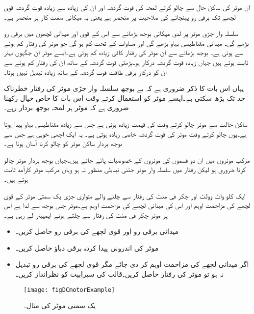 ان موٹر کی ساکن حال سے چالو کرتے لمحہ کی قوت گردشہ اور ان کی زیادہ سے زیادہ قوت گردشہ قوی لچھے تک برقی رو پہنچانے کی صلاحیت پر منحصر ہے یعنی یہ میکانی سمت کار پر منحصر ہے۔

سلسلہ وار جڑی موٹر پر لدی میکانی بوجھ بڑھانے سے اس کے قوی اور میدانی لچھوں میں برقی رو بڑھے گی۔ میدانی مقناطیسی بہاو بڑھے گی اور مساوات   کے تحت  کم ہو گی جو موٹر کی رفتار کم ہونے سے ہوتی ہے۔ بوجھ بڑھانے سے ان موٹر کی رفتار کافی زیادہ کم ہوتی ہے۔ایسے موٹر ان جگہوں بہتر ثابت ہوتے ہیں جہاں زیادہ قوت گردشہ درکار ہو۔بڑھتی قوت گردشہ کے ساتھ ان کی رفتار کم ہونے سے ان کو درکار برقی طاقت قوت گردشہ کے ساتھ زیادہ تبدیل نہیں ہوتا۔

یہاں اس بات کا ذکر ضروری ہے کہ بے بوجھ سلسلہ وار جڑی موٹر کی رفتار خطرناک حد تک بڑھ سکتی ہے۔ایسے موٹر کو استعمال کرتے وقت اس بات کا خاص خیال رکھنا ضروری ہے کہ موٹر ہر لمحہ بوجھ بردار رہے۔

ساکن حالت سے موٹر چالو کرتے وقت    کی قیمت زیادہ ہوتی ہے جس سے زیادہ  مقناطیسی بہاو پیدا ہوتا ہے۔یوں چالو کرتے وقت موٹر کی قوت گردشہ خاصی زیادہ ہوتی ہے۔ یہ ایک اچھی خوبی ہے جس سے بوجھ بردار ساکن موٹر کو چالو کرنا آسان ہوتا ہے۔

مرکب موٹروں میں ان دو قسموں کی موٹروں کے خصوصیات پائے جاتے ہیں۔جہاں بوجھ بردار موٹر چالو کرنا ضروری ہو لیکن رفتار میں سلسلہ وار موٹر جتنی تبدیلی منظور نہ ہو وہاں مرکب موٹر کارآمد ثابت ہوتے ہیں۔

ایک   کلو واٹ  وولٹ اور  چکر فی منٹ کی رفتار سے چلنے والے متوازی جڑی یک سمتی موٹر کے قوی لچھے کی مزاحمت  اوہم اور اس کی میدانی لچھے کی مزاحمت   اوہم ہے۔موٹر جس بوجھ سے لدا ہے اس پر موٹر   چکر فی منٹ کی رفتار سے چلتے ہوئے   ایمپیئر لے رہی ہے۔ 
\begin{itemize}
\item
میدانی برقی رو اور قوی لچھے کی برقی رو حاصل کریں۔
\item
موٹر کی اندرونی پیدا کردہ برقی دباؤ حاصل کریں۔
\item
اگر میدانی لچھے کی مزاحمت  اوہم کر دی جائے  مگر قوی لچھے کی برقی رو تبدیل نہ ہو  تو موٹر کی رفتار حاصل کریں۔قالب کی سیرابیت کو نظرانداز کریں۔
\end{itemize}

\begin{figure}
\centering
\texttt{[image: figDCmotorExample]}
\caption{یک سمتی موٹر کی مثال۔}
\label{شکل_یکسمتی_موٹر_کی_مثال}
\end{figure}

